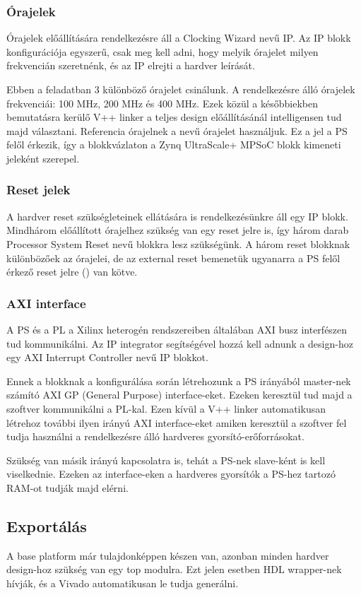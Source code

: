 \subsubsection{Órajelek}
Órajelek előállítására rendelkezésre áll a Clocking Wizard nevű IP. Az IP blokk konfigurációja egyszerű, csak meg kell adni, hogy melyik órajelet milyen frekvencián szeretnénk, és az IP elrejti a hardver leírását.

Ebben a feladatban 3 különböző órajelet csinálunk. A rendelkezésre álló órajelek frekvenciái: 100 MHz, 200 MHz és 400 MHz. Ezek közül a későbbiekben bemutatásra kerülő V++ linker a teljes design előállításánál intelligensen tud majd választani. Referencia órajelnek a  nevű órajelet használjuk. Ez a jel a PS felől érkezik, így a blokkvázlaton a Zynq UltraScale+ MPSoC blokk kimeneti jeleként szerepel.

\subsubsection{Reset jelek}
A hardver reset szükségleteinek ellátására is rendelkezésünkre áll egy IP blokk. Mindhárom előállított órajelhez szükség van egy reset jelre is, így három darab Processor System Reset nevű blokkra lesz szükségünk. A három reset blokknak különbözőek az órajelei, de az external reset bemenetük ugyanarra a PS felől érkező reset jelre () van kötve.

\subsubsection{AXI interface}
A PS és a PL a Xilinx heterogén rendszereiben általában AXI busz interfészen tud kommunikálni. Az IP integrator segítségével hozzá kell adnunk a design-hoz egy AXI Interrupt Controller nevű IP blokkot. 

Ennek a blokknak a konfigurálása során létrehozunk a PS irányából master-nek számító AXI GP (General Purpose) interface-eket. Ezeken keresztül tud majd a szoftver kommunikálni a PL-kal. Ezen kívül a V++ linker automatikusan létrehoz további ilyen irányú AXI interface-eket amiken keresztül a szoftver fel tudja használni a rendelkezésre álló hardveres gyorsító-erőforrásokat.

Szükség van másik irányú kapcsolatra is, tehát a PS-nek slave-ként is kell viselkednie. Ezeken az interface-eken a hardveres gyorsítók a PS-hez tartozó RAM-ot tudják majd elérni.

\subsection{Exportálás}
A base platform már tulajdonképpen készen van, azonban minden hardver design-hoz szükség van egy top modulra. Ezt jelen esetben HDL wrapper-nek hívják, és a Vivado automatikusan le tudja generálni.

